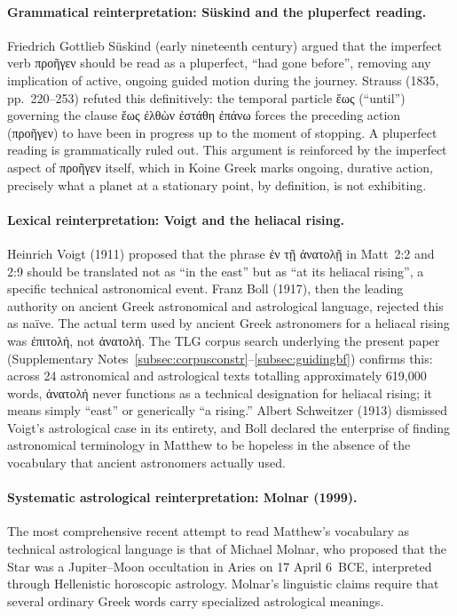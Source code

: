 \documentclass[11pt,a4paper]{article}
\newcommand{\grk}[1]{{\fontencoding{LGR}\selectfont #1}}
\newcommand{\grk}[1]{{\greekfont #1}}
\begin{document}
\paragraph{Grammatical reinterpretation: S\"{u}skind and the pluperfect reading.}
Friedrich Gottlieb S\"{u}skind (early nineteenth century) argued that the imperfect verb
\grk{προῆγεν} should be read as a pluperfect, ``had gone before'', removing any implication
of active, ongoing guided motion during the journey. Strauss (1835, pp.~220--253)\cite{strauss1835}
refuted this definitively: the temporal particle \grk{ἕως} (``until'') governing the clause
\grk{ἕως ἐλθὼν ἐστάθη ἐπάνω} forces the preceding action (\grk{προῆγεν}) to have been in
progress up to the moment of stopping. A pluperfect reading is grammatically ruled out.
This argument is reinforced by the imperfect aspect of \grk{προῆγεν} itself, which in Koine
Greek marks ongoing, durative action, precisely what a planet at a stationary point, by
definition, is not exhibiting.

\paragraph{Lexical reinterpretation: Voigt and the heliacal rising.}
Heinrich Voigt (1911) proposed that the phrase \grk{ἐν τῇ ἀνατολῇ} in Matt~2:2 and 2:9
should be translated not as ``in the east'' but as ``at its heliacal rising'', a specific
technical astronomical event. Franz Boll (1917)\cite{boll1917}, then the leading authority
on ancient Greek astronomical and astrological language, rejected this as na\"{i}ve. The
actual term used by ancient Greek astronomers for a heliacal rising was \grk{ἐπιτολή}, not
\grk{ἀνατολή}. The TLG corpus search underlying the present paper (Supplementary Notes~\ref{subsec:corpusconstr}--\ref{subsec:guidingbf}) confirms this:
across 24 astronomical and astrological texts totalling approximately 619,000 words, \grk{ἀνατολή}
never functions as a technical designation for heliacal rising; it means simply ``east'' or
generically ``a rising.'' Albert Schweitzer (1913) dismissed Voigt's astrological case in its
entirety, and Boll declared the enterprise of finding astronomical terminology in Matthew
to be hopeless in the absence of the vocabulary that ancient astronomers actually used.

\paragraph{Systematic astrological reinterpretation: Molnar (1999).}
The most comprehensive recent attempt to read Matthew's vocabulary as technical astrological
language is that of Michael Molnar\cite{molnar1999}, who proposed that the Star was a
Jupiter--Moon occultation in Aries on 17 April 6~BCE, interpreted through Hellenistic
horoscopic astrology. Molnar's linguistic claims require that several ordinary Greek words
carry specialized astrological meanings.
\end{document}
